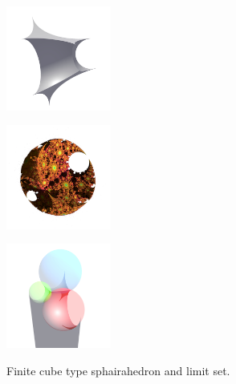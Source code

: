 \documentclass[suppldata, dvipdfmx]{interact}
\theoremstyle{plain}%
\theoremstyle{definition}
\theoremstyle{remark}
\theoremstyle{problemstyle}
\begin{document}
\begin{figure}[H]
 \begin{minipage}{0.5\textwidth}
  \begin{minipage}[t]{0.24\textwidth}
   \centering
   \includegraphics[width=1.35in, height=1.35in,
   keepaspectratio]{./img/sphairahedron/cube/sphairahedronFinite.jpg}
   \label{fig:cubeFiniteSphairahedron}
  \end{minipage}
  \hspace*{\fill}
  \begin{minipage}[t]{0.24\textwidth}
   \centering
   \includegraphics[width=1.35in, height=1.35in,
   keepaspectratio]{./img/sphairahedron/cube/limitsetFinite.jpg}
   \label{fig:cubeFiniteLimitset}
  \end{minipage}
  \hspace*{\fill}
  \caption{Finite cube type sphairahedron and limit set.}
  \label{fig:cubeFinite}
 \end{minipage}
 \hspace*{\fill}
 \begin{minipage}{0.5\textwidth}
  \begin{minipage}[t]{0.24\textwidth}
   \centering
   \includegraphics[width=1.35in, height=1.35in,
   keepaspectratio]{./img/sphairahedron/cube/sphairahedronInf.jpg}
   \label{fig:cubeInfiniteSphairahedron}
  \end{minipage}

\end{minipage}
\end{figure}
\end{document}
